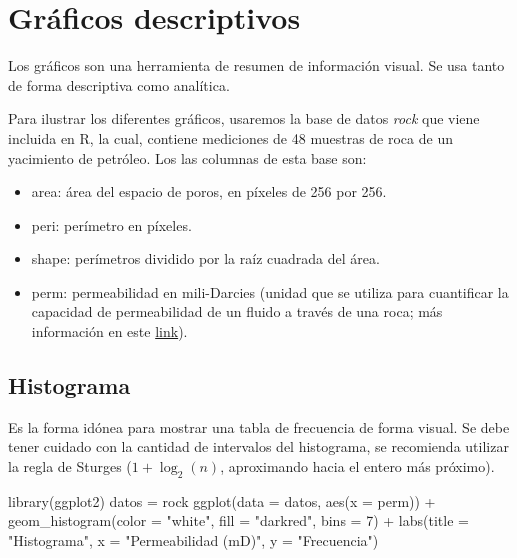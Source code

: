 \documentclass[
]{book}
\newenvironment{Shaded}{\begin{snugshade}}{\end{snugshade}}
\newcommand{\AttributeTok}[1]{\textcolor[rgb]{0.77,0.63,0.00}{#1}}
\newcommand{\DecValTok}[1]{\textcolor[rgb]{0.00,0.00,0.81}{#1}}
\newcommand{\FunctionTok}[1]{\textcolor[rgb]{0.00,0.00,0.00}{#1}}
\newcommand{\NormalTok}[1]{#1}
\newcommand{\OtherTok}[1]{\textcolor[rgb]{0.56,0.35,0.01}{#1}}
\newcommand{\SpecialCharTok}[1]{\textcolor[rgb]{0.00,0.00,0.00}{#1}}
\newcommand{\StringTok}[1]{\textcolor[rgb]{0.31,0.60,0.02}{#1}}
\providecommand{\tightlist}{%
  \setlength{\itemsep}{0pt}\setlength{\parskip}{0pt}}
\theoremstyle{definition}
\theoremstyle{definition}
\theoremstyle{definition}
\theoremstyle{definition}
\theoremstyle{remark}
\begin{document}
\hypertarget{gruxe1ficos-descriptivos}{%
\section{Gráficos descriptivos}\label{gruxe1ficos-descriptivos}}

Los gráficos son una herramienta de resumen de información visual. Se usa tanto de forma descriptiva como analítica.

Para ilustrar los diferentes gráficos, usaremos la base de datos \emph{rock} que viene incluida en R, la cual, contiene mediciones de 48 muestras de roca de un yacimiento de petróleo. Los las columnas de esta base son:

\begin{itemize}
\tightlist
\item
  area: área del espacio de poros, en píxeles de 256 por 256.
\item
  peri: perímetro en píxeles.
\item
  shape: perímetros dividido por la raíz cuadrada del área.
\item
  perm: permeabilidad en mili-Darcies (unidad que se utiliza para cuantificar la capacidad de permeabilidad de un fluido a través de una roca; más información en este \href{https://en.wikipedia.org/wiki/Darcy_(unit)}{link}).
\end{itemize}

\hypertarget{histograma}{%
\subsection*{Histograma}\label{histograma}}

Es la forma idónea para mostrar una tabla de frecuencia de forma visual. Se debe tener cuidado con la cantidad de intervalos del histograma, se recomienda utilizar la regla de Sturges (\(1+\log_2(n)\), aproximando hacia el entero más próximo).

\begin{Shaded}
\begin{Highlighting}[]
\FunctionTok{library}\NormalTok{(ggplot2)}
\NormalTok{datos }\OtherTok{=}\NormalTok{ rock}
\FunctionTok{ggplot}\NormalTok{(}\AttributeTok{data =}\NormalTok{ datos, }\FunctionTok{aes}\NormalTok{(}\AttributeTok{x =}\NormalTok{ perm)) }\SpecialCharTok{+}
  \FunctionTok{geom\_histogram}\NormalTok{(}\AttributeTok{color =} \StringTok{"white"}\NormalTok{, }\AttributeTok{fill =} \StringTok{"darkred"}\NormalTok{, }\AttributeTok{bins =} \DecValTok{7}\NormalTok{) }\SpecialCharTok{+}
  \FunctionTok{labs}\NormalTok{(}\AttributeTok{title =} \StringTok{"Histograma"}\NormalTok{, }\AttributeTok{x =} \StringTok{"Permeabilidad (mD)"}\NormalTok{, }\AttributeTok{y =} \StringTok{"Frecuencia"}\NormalTok{)}
\end{Highlighting}
\end{Shaded}
\end{document}
